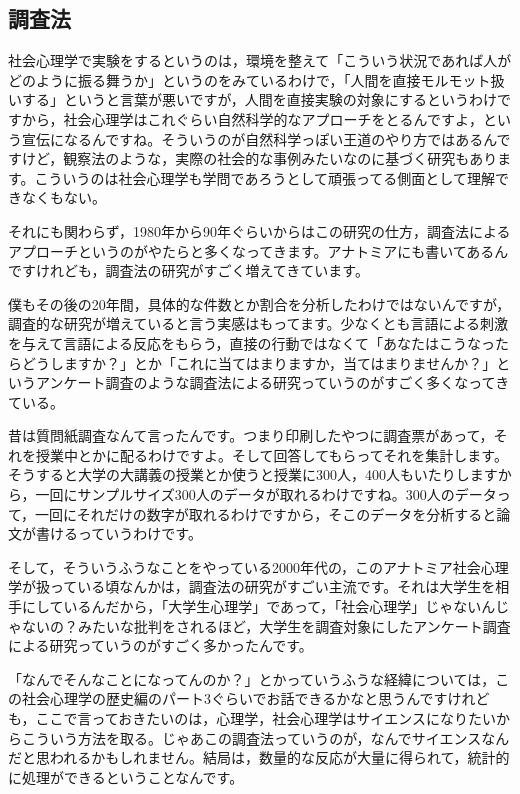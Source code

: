 \documentclass{ltjsbook}
\begin{document}
\subsection{調査法}
社会心理学で実験をするというのは，環境を整えて「こういう状況であれば人がどのように振る舞うか」というのをみているわけで，「人間を直接モルモット扱いする」というと言葉が悪いですが，人間を直接実験の対象にするというわけですから，社会心理学はこれぐらい自然科学的なアプローチをとるんですよ，という宣伝になるんですね。そういうのが自然科学っぽい王道のやり方ではあるんですけど，観察法のような，実際の社会的な事例みたいなのに基づく研究もあります。こういうのは社会心理学も学問であろうとして頑張ってる側面として理解できなくもない。

それにも関わらず，1980年から90年ぐらいからはこの研究の仕方，調査法によるアプローチというのがやたらと多くなってきます。アナトミアにも書いてあるんですけれども，調査法の研究がすごく増えてきています。

僕もその後の20年間，具体的な件数とか割合を分析したわけではないんですが，調査的な研究が増えていると言う実感はもってます。少なくとも言語による刺激を与えて言語による反応をもらう，直接の行動ではなくて「あなたはこうなったらどうしますか？」とか「これに当てはまりますか，当てはまりませんか？」というアンケート調査のような調査法による研究っていうのがすごく多くなってきている。

昔は質問紙調査なんて言ったんです。つまり印刷したやつに調査票があって，それを授業中とかに配るわけですよ。そして回答してもらってそれを集計します。そうすると大学の大講義の授業とか使うと授業に300人，400人もいたりしますから，一回にサンプルサイズ300人のデータが取れるわけですね。300人のデータって，一回にそれだけの数字が取れるわけですから，そこのデータを分析すると論文が書けるっていうわけです。

そして，そういうふうなことをやっている2000年代の，このアナトミア社会心理学が扱っている頃なんかは，調査法の研究がすごい主流です。それは大学生を相手にしているんだから，「大学生心理学」であって，「社会心理学」じゃないんじゃないの？みたいな批判をされるほど，大学生を調査対象にしたアンケート調査による研究っていうのがすごく多かったんです。

「なんでそんなことになってんのか？」とかっていうふうな経緯については，この社会心理学の歴史編のパート3ぐらいでお話できるかなと思うんですけれども，ここで言っておきたいのは，心理学，社会心理学はサイエンスになりたいからこういう方法を取る。じゃあこの調査法っていうのが，なんでサイエンスなんだと思われるかもしれません。結局は，数量的な反応が大量に得られて，統計的に処理ができるということなんです。
\end{document}
